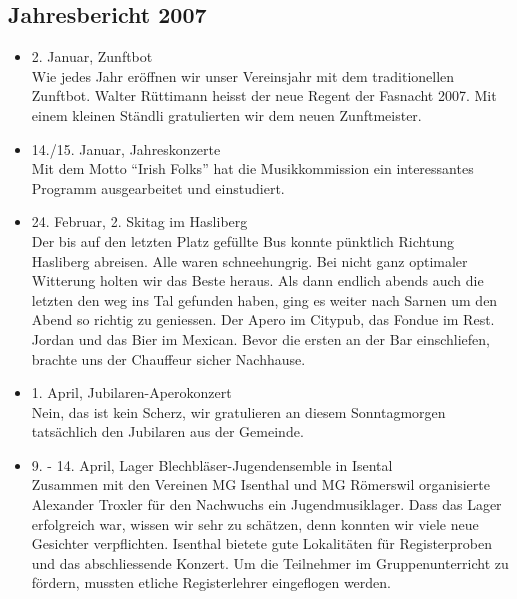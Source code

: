 \subsection{Jahresbericht 2007}

\begin{history}


    \begin{itemize}

        \item[]2. Januar, Zunftbot\\
        Wie jedes Jahr eröffnen wir unser Vereinsjahr mit dem traditionellen
        Zunftbot. Walter Rüttimann heisst der neue Regent der Fasnacht 2007. Mit
        einem kleinen Ständli gratulierten wir dem neuen Zunftmeister.

        \item[]14./15. Januar, Jahreskonzerte\\
        Mit dem Motto \enquote{Irish Folks} hat die Musikkommission ein
        interessantes Programm ausgearbeitet und einstudiert.

        \item[]24. Februar, 2. Skitag im Hasliberg\\
        Der bis auf den letzten Platz gefüllte Bus konnte pünktlich Richtung
        Hasliberg abreisen. Alle waren schneehungrig. Bei nicht ganz optimaler
        Witterung holten wir das Beste heraus. Als dann endlich abends auch die
        letzten den weg ins Tal gefunden haben, ging es weiter nach Sarnen um
        den Abend so richtig zu geniessen. Der Apero im Citypub, das Fondue im
        Rest. Jordan und das Bier im Mexican. Bevor die ersten an der Bar
        einschliefen, brachte uns der Chauffeur sicher Nachhause.

        \item[]1. April, Jubilaren-Aperokonzert\\
        Nein, das ist kein Scherz, wir gratulieren an diesem Sonntagmorgen
        tatsächlich den Jubilaren aus der Gemeinde.

        \item[]9. - 14. April, Lager Blechbläser-Jugendensemble in Isental\\
        Zusammen mit den Vereinen MG Isenthal und MG Römerswil organisierte
        Alexander Troxler für den Nachwuchs ein Jugendmusiklager. Dass das Lager
        erfolgreich war, wissen wir sehr zu schätzen, denn konnten wir viele
        neue Gesichter verpflichten. Isenthal bietete gute Lokalitäten für
        Registerproben und das abschliessende Konzert. Um die Teilnehmer im
        Gruppenunterricht zu fördern, mussten etliche Registerlehrer eingeflogen
        werden.


\end{itemize}
\end{history}
